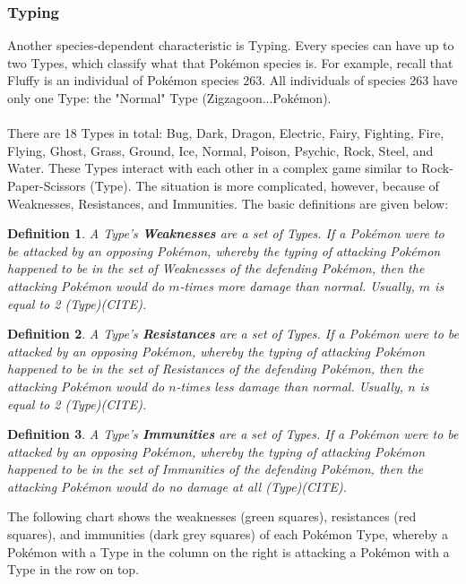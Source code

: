 \documentclass{article}
\newtheorem*{definition*}{Definition}
\begin{document}
\subsubsection{Typing}
Another species-dependent characteristic is Typing. Every species can have up to two Types, which classify what that Pok\'emon species is. For example, recall that Fluffy is an individual of Pok\'emon species 263. All individuals of species 263 have only one Type: the "Normal" Type (Zigzagoon...Pok\'emon).\\\\
There are 18 Types in total: Bug, Dark, Dragon, Electric, Fairy, Fighting, Fire, Flying, Ghost, Grass, Ground, Ice, Normal, Poison, Psychic, Rock, Steel, and Water. These Types interact with each other in a complex game similar to Rock-Paper-Scissors (Type). The situation is more complicated, however, because of Weaknesses, Resistances, and Immunities. The basic definitions are given below:
\begin{definition*}
	A Type's \textbf{Weaknesses} are a set of Types. If a Pok\'emon were to be attacked by an opposing Pok\'emon, whereby the typing of attacking Pok\'emon happened to be in the set of Weaknesses of the defending Pok\'emon, then the attacking Pok\'emon would do $m$-times more damage than normal. Usually, $m$ is equal to 2 (Type)(CITE).
\end{definition*}
\begin{definition*}
	A Type's \textbf{Resistances} are a set of Types. If a Pok\'emon were to be attacked by an opposing Pok\'emon, whereby the typing of attacking Pok\'emon happened to be in the set of Resistances of the defending Pok\'emon, then the attacking Pok\'emon would do $n$-times less damage than normal. Usually, $n$ is equal to 2 (Type)(CITE).
\end{definition*}
\begin{definition*}
	A Type's \textbf{Immunities} are a set of Types. If a Pok\'emon were to be attacked by an opposing Pok\'emon, whereby the typing of attacking Pok\'emon happened to be in the set of Immunities of the defending Pok\'emon, then the attacking Pok\'emon would do no damage at all (Type)(CITE).
\end{definition*}
The following chart shows the weaknesses (green squares), resistances (red squares), and immunities (dark grey squares) of each Pok\'emon Type, whereby a Pok\'emon with a Type in the column on the right is attacking a Pok\'emon with a Type in the row on top.
\end{document}
